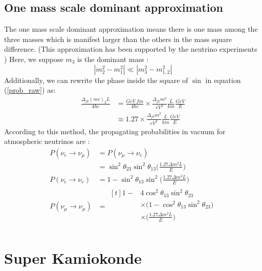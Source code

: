 \documentclass[12pt]{article}
\begin{document}
\begin{multicols}{2}
        \subsection{One mass scale dominant approximation}
        The one mass scale dominant approximation means there is one mass among the three masses which is manifest larger than the others in the mass square difference. (This approximation has been supported by the neutrino experiments \cite{SKexp}) Here, we suppose $m_3$ is the dominant mass :
        \[
            |m_{2}^{2} - m_{1}^{2}| \ll |m_{3}^{2} - m_{1,2}^{2}|
        \]
        Additionally, we can rewrite the phase inside the square of $\sin$ in equation (\ref{prob_raw}) as:
        \begin{align*}
            \frac{\Delta_{jk}(mc)_{2}L}{4 \hbar c} &= \frac{GeV\ fm}{4 \hbar c} \times \frac{\Delta_{jk} m^2}{eV^2} \frac{L}{km} \frac{GeV}{E}\\
            &\approx 1.27 \times \frac{\Delta_{jk} m^2}{eV^2} \frac{L}{km} \frac{GeV}{E}
        \end{align*}
        According to this method, the propagating probabilities in vacuum for atmospheric neutrinos are \cite{SKexp} : 
        \begin{align*}
                P(\nu_{e} \rightarrow \nu_{\mu})    &= P(\nu_{\mu}\rightarrow \nu_{e})\\
                                                    &= \sin^{2}\theta_{23} \sin^{2}\theta_{13} \Big( \frac{1.27 \Delta m^{2} L}{E} \Big)\\
                P(\nu_{e} \rightarrow \nu_{e})      &= 1 - \sin^{2}\theta_{13}\sin^{2} \Big( \frac{1.27\Delta m^{2} L}{E} \Big)\\ 
                P(\nu_{\mu} \rightarrow \nu_{\mu})  &= \begin{aligned}[t]
                                                            1 - &4 \cos^{2}\theta_{13}\sin^{2}\theta_{23}\\
                                                                &\times \big( 1 - \cos^{2}\theta_{13}\sin^{2} \theta_{23} \big)\\
                                                                &\times \Big( \frac{1.27\Delta m^{2} L}{E} \Big)\\
                                                        \end{aligned}
        \end{align*}


\section{Super Kamiokonde}
    

\end{multicols}
\end{document}
